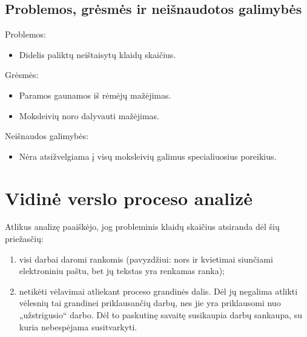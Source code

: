 \subsection{Problemos, grėsmės ir neišnaudotos galimybės}

Problemos:
\begin{itemize}
  \item Didelis paliktų neištaisytų klaidų skaičius.
\end{itemize}

Grėsmės:
\begin{itemize}
  \item Paramos gaunamos iš rėmėjų mažėjimas. 
  \item Moksleivių noro dalyvauti mažėjimas.
\end{itemize}

Neišnaudos galimybės:
\begin{itemize}
  \item Nėra atsižvelgiama į visų moksleivių galimus specialiuosius 
    poreikius.
\end{itemize}

\section{Vidinė verslo proceso analizė}

Atlikus analizę paaiškėjo, jog probleminis klaidų skaičius atsiranda dėl
šių priežasčių:
\begin{enumerate}
  \item visi darbai daromi rankomis (pavyzdžiui: nors ir kvietimai
    siunčiami elektroniniu paštu, bet jų tekstas yra renkamas ranka);
  \item netikėti vėlavimai atliekant proceso grandinės dalis. Dėl jų 
    negalima atlikti vėlesnių tai grandinei priklausančių darbų, nes
    jie yra priklausomi nuo „užstrigusio“ darbo. Dėl to paskutinę 
    savaitę susikaupia
    darbų sankaupa, su kuria nebespėjama susitvarkyti.
\end{enumerate}

